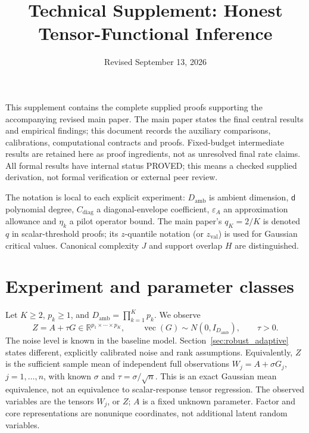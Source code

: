 \documentclass[11pt]{article}
\title{Technical Supplement: Honest Tensor-Functional Inference}
\author{}\date{Revised September 13, 2026}
\theoremstyle{remark}
\newcommand{\R}{\mathbb R}
\begin{document}
\maketitle
This supplement contains the complete supplied proofs supporting the accompanying revised main paper. The main paper states the final central results and empirical findings; this document records the auxiliary comparisons, calibrations, computational contracts and proofs. Fixed-budget intermediate results are retained here as proof ingredients, not as unresolved final rate claims. All formal results have internal status PROVED; this means a checked supplied derivation, not formal verification or external peer review.

The notation is local to each explicit experiment: $D_{\mathrm{amb}}$ is ambient dimension, $\mathsf d$ polynomial degree, $C_{\mathrm{diag}}$ a diagonal-envelope coefficient, $\varepsilon_A$ an approximation allowance and $\eta_k$ a pilot operator bound. The main paper's $q_K=2/K$ is denoted $q$ in scalar-threshold proofs; its $z$-quantile notation (or $z_{\mathrm{val}}$) is used for Gaussian critical values. Canonical complexity $J$ and support overlap $H$ are distinguished.

\tableofcontents
\section{Experiment and parameter classes}\label{sec:model}

Let $K\ge2$, $p_k\ge1$, and $D_{\mathrm{amb}}=\prod_{k=1}^K p_k$. We observe
\begin{equation}\label{eq:model}
 Z=A+\tau G\in\R^{p_1\times\cdots\times p_K},\qquad
 \operatorname{vec}(G)\sim N(0,I_{D_{\mathrm{amb}}}),\qquad \tau>0.
\end{equation}
The noise level is known in the baseline model. Section~\ref{sec:robust_adaptive} states different, explicitly calibrated noise and rank assumptions. Equivalently, $Z$ is the sufficient sample mean of independent full observations $W_j=A+\sigma G_j$, $j=1,\ldots,n$, with known $\sigma$ and $\tau=\sigma/\sqrt n$. This is an exact Gaussian mean equivalence, not an equivalence to scalar-response tensor regression. The observed variables are the tensors $W_j$, or $Z$; $A$ is a fixed unknown parameter. Factor and core representations are nonunique coordinates, not additional latent random variables.
\end{document}
